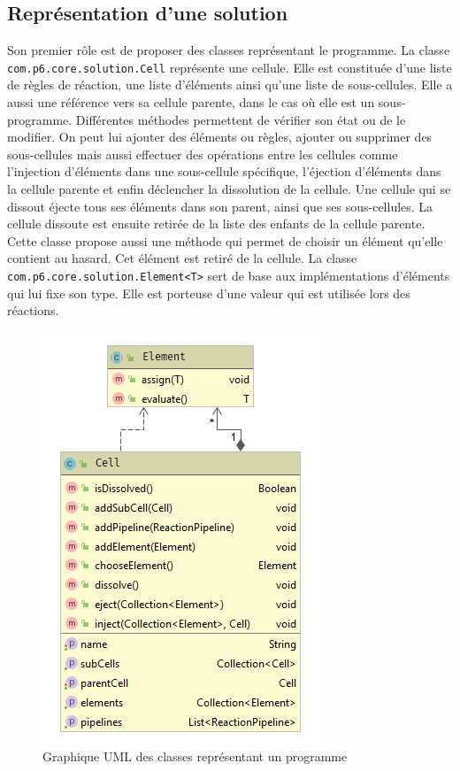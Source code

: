 \documentclass[a4paper, 12pt]{article}
\newcommand{\inline}[1]{\texttt{#1}}
\begin{document}
\subsection{Représentation d'une solution}
Son premier rôle est de proposer des classes représentant le programme. La classe \inline{com.p6.core.solution.Cell} représente une cellule. Elle est constituée d’une liste de règles de réaction, une liste d’éléments ainsi qu’une liste de sous-cellules. Elle a aussi une référence vers sa cellule parente, dans le cas où elle est un sous-programme. Différentes méthodes permettent de vérifier son état ou de le modifier. On peut lui ajouter des éléments ou règles, ajouter ou supprimer des sous-cellules mais aussi effectuer des opérations entre les cellules comme l’injection d’éléments dans une sous-cellule spécifique, l’éjection d’éléments dans la cellule parente et enfin déclencher la  dissolution de la cellule. Une cellule qui se dissout éjecte tous ses éléments dans son parent, ainsi que ses sous-cellules. La cellule dissoute est ensuite retirée de la liste des enfants de la cellule parente. Cette classe propose aussi une méthode qui permet de choisir un élément qu’elle contient au hasard. Cet élément est retiré de la cellule. La classe \inline{com.p6.core.solution.Element<T>} sert de base aux implémentations d’éléments qui lui fixe son type. Elle est porteuse d’une valeur qui est utilisée lors des réactions.

\begin{figure}[!ht]
  \centering
  \includegraphics[scale=0.8]{./img/Core_solution.png}
  \caption{Graphique UML des classes représentant un programme}
\end{figure}
\end{document}
